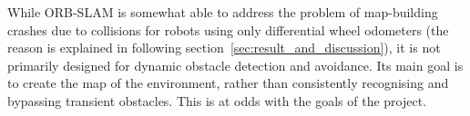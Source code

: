 While ORB-SLAM is somewhat able to address the problem of map-building crashes due to collisions for robots using only differential wheel odometers
(the reason is explained in following section~\ref{sec:result_and_discussion}),
it is not primarily designed for dynamic obstacle detection and avoidance. 
Its main goal is to create the map of the environment, rather than consistently recognising and bypassing transient obstacles.
This is at odds with the goals of the project.
